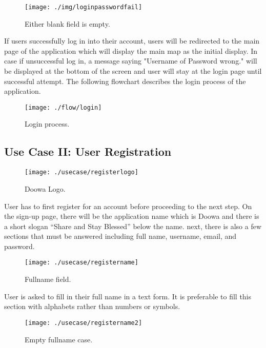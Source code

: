 \documentclass[conference]{IEEEtran}
\begin{document}
\begin{figure}[h!]
\texttt{[image: ./img/loginpasswordfail]}
\centering
\caption{Either blank field is empty.}
\end{figure}

If users successfully log in into their account, users will be redirected to the main page of the application which will display the main map as the initial display. In case if unsuccessful log in, a message saying "Username of Password wrong." will be displayed at the bottom of the screen and user will stay at the login page until successful attempt. The following flowchart describes the login process of the application.

\begin{figure}[h!]
\texttt{[image: ./flow/login]}
\centering
\caption{Login process.}
\end{figure}

\subsection{Use Case II: User Registration}

\begin{figure}[h!]
\texttt{[image: ./usecase/registerlogo]}
\centering
\caption{Doowa Logo.}
\end{figure}

\par User has to first register for an account before proceeding to the next step. On the sign-up page, there will be the application name which is Doowa and there is a short slogan “Share and Stay Blessed” below the name. next, there is also a few sections that must be answered including full name, username, email, and password. 

\begin{figure}[h!]
\texttt{[image: ./usecase/registername]}
\centering
\caption{Fullname field.}
\end{figure}
\par User is asked to fill in their full name in a text form. It is preferable to fill this section with alphabets rather than numbers or symbols. 
\begin{figure}[h!]
\texttt{[image: ./usecase/registername2]}
\centering
\caption{Empty fullname case.}
\end{figure}
\end{document}
